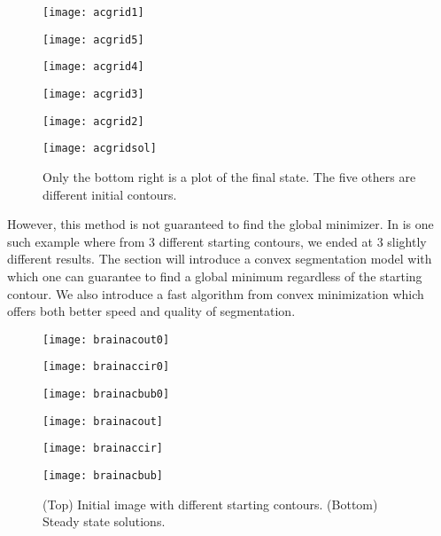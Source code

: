 \begin{figure}[htb!]
	\centering
	\begin{minipage}{0.31\textwidth}
		\texttt{[image: acgrid1]}
	\end{minipage}%
	\begin{minipage}{0.31\textwidth}
		\texttt{[image: acgrid5]}
	\end{minipage}%
	\begin{minipage}{0.31\textwidth}
		\texttt{[image: acgrid4]}
	\end{minipage}
	\begin{minipage}{0.31\textwidth}
		\texttt{[image: acgrid3]}
	\end{minipage}%
	\begin{minipage}{0.31\textwidth}
		\texttt{[image: acgrid2]}
	\end{minipage}%
	\begin{minipage}{0.31\textwidth}
		\texttt{[image: acgridsol]}
	\end{minipage}
	
	\caption{Only the bottom right  is a plot of the final state. The five others are different initial contours.}
	\label{fig:grid_acwe}
\end{figure}
However, this method is not guaranteed to find the global minimizer. In  is one such example where from 3 different starting contours, we ended at 3 slightly different results. The section will introduce a convex segmentation model with which one can guarantee to find a global minimum regardless of the starting contour. We also introduce a fast algorithm from convex minimization which offers both better speed and quality of segmentation.
\begin{figure}[htb!]
	\centering
	\begin{minipage}{0.31\textwidth}
		\texttt{[image: brainacout0]}
	\end{minipage}%
	\begin{minipage}{0.31\textwidth}
		\texttt{[image: brainaccir0]}
	\end{minipage}%
	\begin{minipage}{0.31\textwidth}
		\texttt{[image: brainacbub0]}
	\end{minipage}
	\begin{minipage}{0.31\textwidth}
		\texttt{[image: brainacout]}
	\end{minipage}%
	\begin{minipage}{0.31\textwidth}
		\texttt{[image: brainaccir]}
	\end{minipage}%
	\begin{minipage}{0.31\textwidth}
		\texttt{[image: brainacbub]}
	\end{minipage}
	\caption{(Top) Initial image with different starting contours. (Bottom) Steady state solutions.}
	\label{fig:target_acwe}
\end{figure}
